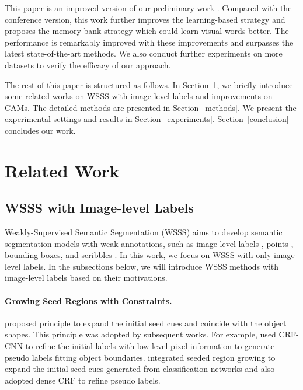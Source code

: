\par This paper is an improved version of our preliminary work \citep{ru2021learning}. Compared with the conference version, this work further improves the learning-based strategy and proposes the memory-bank strategy which could learn visual words better. The performance is remarkably improved with these improvements and surpasses the latest state-of-the-art methods. We also conduct further experiments on more datasets to verify the efficacy of our approach.

\par The rest of this paper is structured as follows. In Section~\ref{related_work}, we briefly introduce some related works on WSSS with image-level labels and improvements on CAMs. The detailed methods are presented in Section~\ref{methods}. We present the experimental settings and results in Section~\ref{experiments}. Section~\ref{conclusion} concludes our work.

\section{Related Work}
\label{related_work}

\subsection{WSSS with Image-level Labels}
\par Weakly-Supervised Semantic Segmentation (WSSS) aims to develop semantic segmentation models with weak annotations, such as image-level labels \citep{papandreou2015weakly,pinheiro2015image,ahn2018learning,lee2021anti}, points \citep{bearman2016s}, bounding boxes\citep{song2019box,oh2021background,lee2021bbam}, and scribbles \citep{lin2016scribblesup}. In this work, we focus on WSSS with only image-level labels. In the subsections below, we will introduce WSSS methods with image-level labels based on their motivations.

\paragraph{\textbf{Growing Seed Regions with Constraints.}} \citep{kolesnikov2016seed} proposed  principle to expand the initial seed cues and coincide with the object shapes. This principle was adopted by subsequent works. For example, \citep{roy2017combining} used CRF-CNN \citep{zheng2015conditional} to refine the initial labels with low-level pixel information to generate pseudo labels fitting object boundaries. \citep{huang2018weakly} integrated seeded region growing \citep{adams1994seeded} to expand the initial seed cues generated from classification networks and also adopted dense CRF \citep{krahenbuhl2011efficient} to refine pseudo labels.

